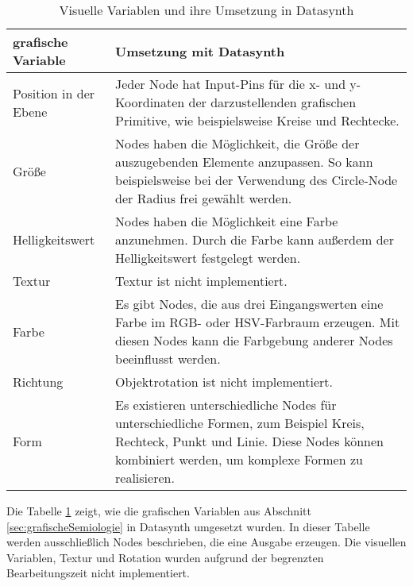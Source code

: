 \documentclass[a4paper, 
               12pt,
               DIV=calc,
               version=first,
               pdftex,
               headsepline,
               footsepline,
               bibtotocnumbered,
               liststotocnumbered]{scrreprt}
\begin{document}
\begin{table}
\centering
\begin{tabular}{|l|p{9cm}|}
\hline
\textbf{grafische Variable} & \textbf{Umsetzung mit Datasynth}\\
\hline
Position in der Ebene & Jeder Node hat Input-Pins für die x- und y-Koordinaten der darzustellenden grafischen Primitive, wie
beispielsweise Kreise und Rechtecke.\\
\hline
Größe & Nodes haben die Möglichkeit, die Größe der auszugebenden Elemente anzupassen.
So kann beispielsweise bei der Verwendung des Circle-Node der Radius frei gewählt werden.\\
\hline
Helligkeitswert & Nodes haben die Möglichkeit eine Farbe anzunehmen. Durch die Farbe kann
außerdem der Helligkeitswert festgelegt werden.\\
\hline
Textur & Textur ist nicht implementiert.\\
\hline
Farbe & Es gibt Nodes, die aus drei Eingangswerten eine Farbe im RGB- oder HSV-Farbraum erzeugen. Mit diesen Nodes kann die Farbgebung
anderer Nodes beeinflusst werden.\\
\hline
Richtung & Objektrotation ist nicht implementiert.\\
\hline
Form & Es existieren unterschiedliche Nodes für unterschiedliche Formen, zum Beispiel Kreis, Rechteck, Punkt und Linie. Diese Nodes
können kombiniert werden, um komplexe Formen zu realisieren.\\
\hline
\end{tabular}
\caption{Visuelle Variablen und ihre Umsetzung in Datasynth}
\label{tab:vars}
\end{table}
Die Tabelle \ref{tab:vars} zeigt, wie die grafischen Variablen aus Abschnitt
\ref{sec:grafischeSemiologie} in Datasynth umgesetzt wurden. In dieser Tabelle werden ausschließlich
Nodes beschrieben, die eine Ausgabe erzeugen. Die visuellen Variablen, Textur und Rotation
wurden aufgrund der begrenzten Bearbeitungszeit nicht implementiert.
\end{document}
